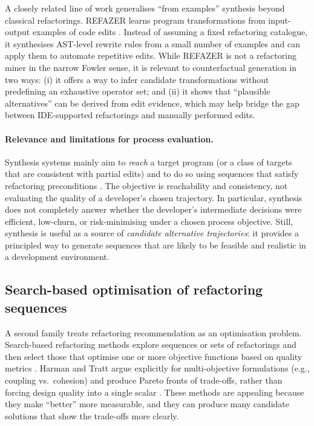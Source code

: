 A closely related line of work generalises ``from examples'' synthesis beyond classical refactorings. REFAZER learns program transformations from input-output examples of code edits \cite{rolim2017refazer}. Instead of assuming a fixed refactoring catalogue, it synthesises AST-level rewrite rules from a small number of examples and can apply them to automate repetitive edits. While REFAZER is not a refactoring miner in the narrow Fowler sense, it is relevant to counterfactual generation in two ways: (i) it offers a way to infer candidate transformations without predefining an exhaustive operator set; and (ii) it shows that ``plausible alternatives'' can be derived from edit evidence, which may help bridge the gap between IDE-supported refactorings and manually performed edits.

\paragraph{Relevance and limitations for process evaluation.}
Synthesis systems mainly aim to \emph{reach} a target program (or a class of targets that are consistent with partial edits) and to do so using sequences that satisfy refactoring preconditions \cite{raychev2013resynth}. The objective is reachability and consistency, not evaluating the quality of a developer's chosen trajectory. In particular, synthesis does not completely answer whether the developer's intermediate decisions were efficient, low-churn, or risk-minimising under a chosen process objective. Still, synthesis is useful as a source of \emph{candidate alternative trajectories}: it provides a principled way to generate sequences that are likely to be feasible and realistic in a development environment.

\subsection{Search-based optimisation of refactoring sequences}
A second family treats refactoring recommendation as an optimisation problem. Search-based refactoring methods explore sequences or sets of refactorings and then select those that optimise one or more objective functions based on quality metrics \cite{harman2007pareto}. Harman and Tratt argue explicitly for multi-objective formulations (e.g., coupling vs.\ cohesion) and produce Pareto fronts of trade-offs, rather than forcing design quality into a single scalar \cite{harman2007pareto}. These methods are appealing because they make ``better'' more measurable, and they can produce many candidate solutions that show the trade-offs more clearly.

